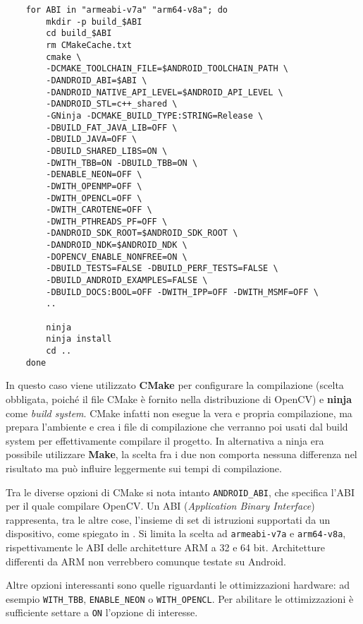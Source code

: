 
\begin{verbatim}
    for ABI in "armeabi-v7a" "arm64-v8a"; do
        mkdir -p build_$ABI
        cd build_$ABI
        rm CMakeCache.txt
        cmake \
        -DCMAKE_TOOLCHAIN_FILE=$ANDROID_TOOLCHAIN_PATH \
        -DANDROID_ABI=$ABI \
        -DANDROID_NATIVE_API_LEVEL=$ANDROID_API_LEVEL \
        -DANDROID_STL=c++_shared \
        -GNinja -DCMAKE_BUILD_TYPE:STRING=Release \
        -DBUILD_FAT_JAVA_LIB=OFF \
        -DBUILD_JAVA=OFF \
        -DBUILD_SHARED_LIBS=ON \
        -DWITH_TBB=ON -DBUILD_TBB=ON \
        -DENABLE_NEON=OFF \
        -DWITH_OPENMP=OFF \
        -DWITH_OPENCL=OFF \
        -DWITH_CAROTENE=OFF \
        -DWITH_PTHREADS_PF=OFF \
        -DANDROID_SDK_ROOT=$ANDROID_SDK_ROOT \
        -DANDROID_NDK=$ANDROID_NDK \
        -DOPENCV_ENABLE_NONFREE=ON \
        -DBUILD_TESTS=FALSE -DBUILD_PERF_TESTS=FALSE \
        -DBUILD_ANDROID_EXAMPLES=FALSE \
        -DBUILD_DOCS:BOOL=OFF -DWITH_IPP=OFF -DWITH_MSMF=OFF \
        ..
    
        ninja
        ninja install
        cd ..
    done
\end{verbatim}

In questo caso viene utilizzato \textbf{CMake} per configurare la compilazione (scelta obbligata, poiché il file CMake è fornito 
nella distribuzione di OpenCV) e \textbf{ninja} come \textit{build system}. 
CMake infatti non esegue la vera e propria compilazione, ma prepara l'ambiente e crea i file di compilazione che 
verranno poi usati dal build system per effettivamente compilare il progetto. In alternativa a ninja era possibile 
utilizzare \textbf{Make}, la scelta fra i due non comporta nessuna differenza nel risultato ma può influire leggermente 
sui tempi di compilazione.

Tra le diverse opzioni di CMake si nota intanto \texttt{ANDROID\_ABI}, che specifica l'ABI per il quale compilare OpenCV. 
Un ABI (\textit{Application Binary Interface}) rappresenta, tra le altre cose, l'insieme di set di istruzioni
supportati da un dispositivo, come spiegato in \cite{adev_abi}. 
Si limita la scelta ad \texttt{armeabi-v7a} e \texttt{arm64-v8a}, rispettivamente le ABI delle architetture ARM a 32 e 64 bit. 
Architetture differenti da ARM non verrebbero comunque testate su Android.

Altre opzioni interessanti sono quelle riguardanti le ottimizzazioni hardware: ad esempio \texttt{WITH\_TBB}, 
\texttt{ENABLE\_NEON} o \texttt{WITH\_OPENCL}. Per abilitare le ottimizzazioni è sufficiente settare a \texttt{ON}
l'opzione di interesse.

